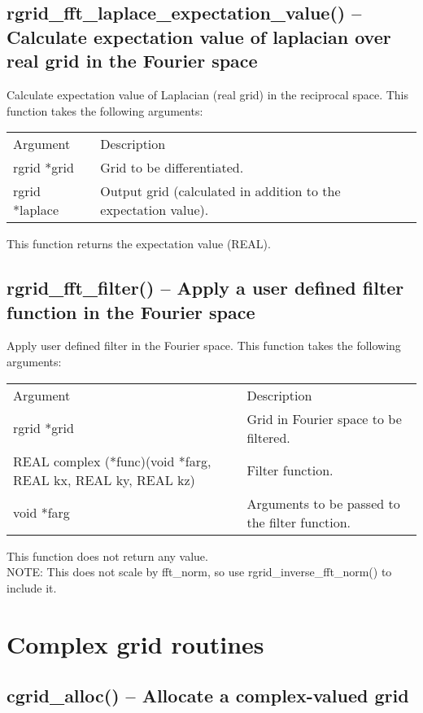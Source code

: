 \documentclass[12pt,letterpaper]{report}
\begin{document}
\subsection{rgrid\_fft\_laplace\_expectation\_value() -- Calculate expectation value of laplacian over real grid in the Fourier space}

Calculate expectation value of Laplacian (real grid) in the reciprocal space. This function takes the following arguments:
\begin{longtable}{p{} p{}}
Argument & Description\\
\cline{1-2}
rgrid *grid & Grid to be differentiated.\\
rgrid *laplace & Output grid (calculated in addition to the expectation value).\\
\end{longtable}
\noindent
This function returns the expectation value (REAL).

\subsection{rgrid\_fft\_filter() -- Apply a user defined filter function in the Fourier space}

Apply user defined filter in the Fourier space. This function takes the following arguments:
\begin{longtable}{p{} p{}}
Argument & Description\\
\cline{1-2}
rgrid *grid & Grid in Fourier space to be filtered.\\
REAL complex (*func)(void *farg, REAL kx, REAL ky, REAL kz) & Filter function.\\
void *farg & Arguments to be passed to the filter function.\\
\end{longtable}
\noindent
This function does not return any value.\\
NOTE: This does not scale by fft\_norm, so use rgrid\_inverse\_fft\_norm() to include it.

\section{Complex grid routines}

\subsection{cgrid\_alloc() -- Allocate a complex-valued grid}
\end{document}
